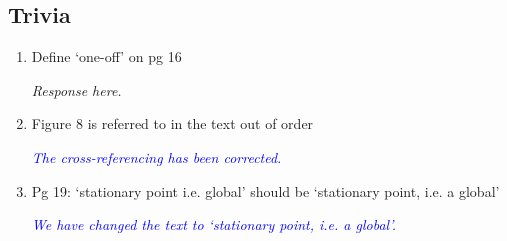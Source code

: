 \documentclass{article}
\newcommand{\parham}[1]{\textcolor{blue}{#1}}
\begin{document}
			\subsection{Trivia}
			\begin{enumerate}
			 \item 	Define `one-off' on pg 16 

 			\emph{Response here.}

  		\item Figure 8 is referred to in the text out of order

  			\emph{\parham{The cross-referencing has been corrected.}}
			 
			\item Pg 19: `stationary point i.e. global' should be `stationary point, i.e. a global'

			\emph{\parham{We have changed the text to `stationary point, i.e. a global'.}}			
			                   
			
			 
				\end{enumerate} 
				
			
\end{document}
